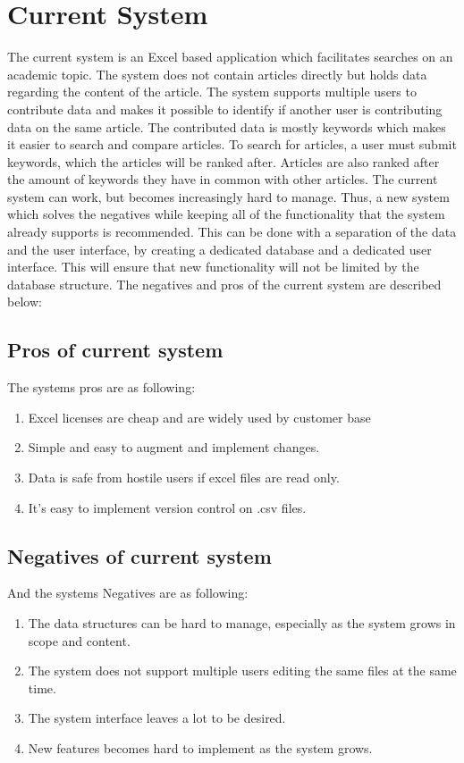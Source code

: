 \section{Current System}

The current system is an Excel based application which facilitates searches on an academic topic. The system does not contain articles directly but holds data regarding the content of the article. 
The system supports multiple users to contribute data and makes it possible to identify if another user is contributing data on the same article. The contributed data is mostly keywords which makes it easier to search and compare articles. To search for articles, a user must submit keywords, which the articles will be ranked after. Articles are also ranked after the amount of keywords they have in common with other articles. The current system can work, but becomes increasingly hard to manage. Thus, a new system which solves the negatives while keeping all of the functionality that the system already supports is recommended. This can be done with a separation of the data and the user interface, by creating a dedicated database and a dedicated user interface. This will ensure that new functionality will not be limited by the database structure. The negatives and pros of the current system are described below:


\subsection{Pros of current system}
The systems pros are as following:

\begin{enumerate}
	\item Excel licenses are cheap and are widely used by customer base
	\item Simple and easy to augment and implement changes.
	\item Data is safe from hostile users if excel files are read only. 
	\item It's easy to implement version control on .csv files. 
\end{enumerate}

\subsection{Negatives of current system} 
And the systems Negatives are as following: 

\begin{enumerate}
	\item The data structures can be hard to manage, especially as the system grows in scope and content.
	\item The system does not support multiple users editing the same files at the same time.
	\item The system interface leaves a lot to be desired.
	\item New features becomes hard to implement as the system grows.
\end{enumerate}

